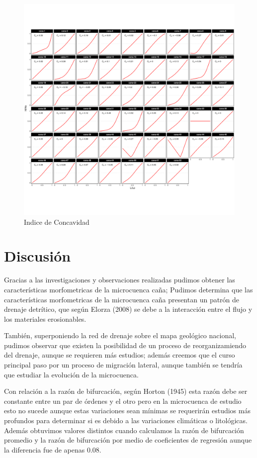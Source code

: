 \documentclass[11pt,]{article}
\begin{document}
\begin{figure}
\centering
\includegraphics{indice_concavidad.png}
\caption{Indice de Concavidad\label{indiceconcavidad}}
\end{figure}

\section{Discusión}\label{discusiuxf3n}

Gracias a las investigaciones y observaciones realizadas pudimos obtener
las características morfometricas de la microcuenca caña; Pudimos
determina que las características morfometricas de la microcuenca caña
presentan un patrón de drenaje detrítico, que según Elorza (2008) se
debe a la interacción entre el flujo y los materiales erosionables.

También, superponiendo la red de drenaje sobre el mapa geológico
nacional, pudimos observar que existen la posibilidad de un proceso de
reorganizamiendo del drenaje, aunque se requieren más estudios; además
creemos que el curso principal paso por un proceso de migración lateral,
aunque también se tendría que estudiar la evolución de la microcuenca.

Con relación a la razón de bifurcación, según Horton (1945) esta razón
debe ser constante entre un par de órdenes y el otro pero en la
microcuenca de estudio esto no sucede aunque estas variaciones sean
mínimas se requerirán estudios más profundos para determinar si es
debido a las variaciones climáticas o litológicas. Además obtuvimos
valores distintos cuando calculamos la razón de bifurcación promedio y
la razón de bifurcación por medio de coeficientes de regresión aunque la
diferencia fue de apenas 0.08.
\end{document}
